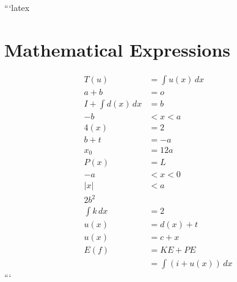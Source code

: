 ```latex
\section*{Mathematical Expressions}

\begin{align*}
    T(u) &= \int u(x) \, dx \\
    a + b &= o \\
    I + \int d(x) \, dx &= b \\
    -b &< x < a \\
    4(x) &= 2 \\
    b + t &= -a \\
    x_0 &= 12a \\
    P(x) &= L \\
    -a &< x < 0 \\
    |x| &< a \\
    2b^2 \\
    \int k \, dx &= 2 \\
    u(x) &= d(x) + t \\
    u(x) &= c + x \\
    E(f) &= KE + PE \\
    &= \int (i + u(x)) \, dx
\end{align*}
```
